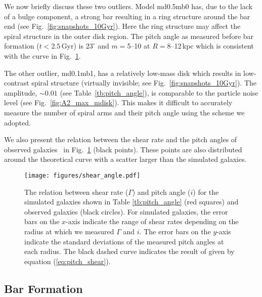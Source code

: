 We now briefly discuss these two outliers.
Model md0.5mb0 has, due to the lack of a bulge component,
a strong bar resulting in a ring structure around the 
bar end (see Fig.~\ref{fig:snapshots_10Gyr}).
Here the ring structure may affect the spiral structure in the 
outer disk region.
The pitch angle as measured before bar formation ($t<2.5$\,Gyr)
is $23^{\circ}$ and $m=$5--10 at $R=8$--12\,kpc which is 
consistent with the curve in Fig.~\ref{fig:pitch_angle}.

The other outlier, md0.1mb1, has a relatively low-mass disk which results
in low-contrast spiral structure (virtually invisible; see Fig.~\ref{fig:snapshots_10Gyr}).
The amplitude, $\sim 0.01$ (see Table~\ref{tb:pitch_angle}), is
comparable to the particle noise level (see Fig.~\ref{fig:A2_max_mdisk}).
This makes it difficult  
to accurately measure the number of spiral arms 
and their pitch angle using the scheme we adopted.



We also present the relation between the shear rate and 
the pitch angles of observed galaxies~\citep{2006ApJ...645.1012S} in 
Fig.~\ref{fig:pitch_angle} (black points). These points are also 
distributed around the theoretical curve with a scatter
larger than the simulated galaxies.   


\begin{figure}
\texttt{[image: figures/shear\_angle.pdf]}
\caption{The relation between shear rate ($\Gamma$) and pitch angle ($i$)
for the simulated galaxies shown in Table \ref{tb:pitch_angle} (red squares) 
and observed galaxies \citep{2006ApJ...645.1012S} (black circles). 
For simulated galaxies, the error bars on the $x$-axis indicate the range of 
shear rates depending on the radius at which we measured $\Gamma$ and $i$.
The error bars on the $y$-axis indicate the 
standard deviations of the measured pitch angles at each radius. 
The black dashed curve indicates the 
result of \citet{2014ApJ...787..174M} given by equation (\ref{eq:pitch_shear}). \label{fig:pitch_angle}}
\end{figure}




\subsection{Bar Formation}\label{Sect:bf}

